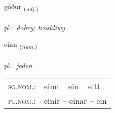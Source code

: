 \documentclass[frontgrid, backgrid]{flacards}\usepackage[]{graphicx}\usepackage[]{xcolor}
\begin{document}
\renewcommand{\flhead}{\vskip5pt \fboxsep=0pt {\small\bfseries\footnotesize Lýsingarorð | Adjective}}
\renewcommand{\fcfoot}{\vskip5pt \fboxsep=0pt \hspace{2pt}{\small\bfseries\footnotesize 1K}}

\renewcommand{\blhead}{\vskip5pt {\small\bfseries\footnotesize Lýsingarorð | Adjective }}
\renewcommand{\bcfoot}{\vskip5pt \hspace{2pt}{\small\bfseries\footnotesize 1K}}


{góður \small{\textsubscript{(\textit{adj.})}} \\[1ex] %
\textphonetic{[kouːðʏr]} \\
pl.: \emph{dobry; troskliwy} \\  [2ex]
\renewcommand*{\arraystretch}{0.8}
}

\renewcommand{\flhead}{\vskip5pt \fboxsep=0pt {\small\bfseries\footnotesize Töluorð | Numeral}}
\renewcommand{\fcfoot}{\vskip5pt \fboxsep=0pt \hspace{2pt}{\small\bfseries\footnotesize 1K}}

\renewcommand{\blhead}{\vskip5pt {\small\bfseries\footnotesize Töluorð | Numeral }}
\renewcommand{\bcfoot}{\vskip5pt \hspace{2pt}{\small\bfseries\footnotesize 1K}}


{einn \small{\textsubscript{(\textit{num.})}} \\[1ex] %
\textphonetic{[eitn̥]} \\
pl.: \emph{jeden} \\  [2ex]
\renewcommand*{\arraystretch}{0.8}
\begin{tabular}{ll}
\textsc{sg.nom.}: & einn  --  ein -- eitt \\ 
\textsc{pl.nom.}: & einir -- einar -- ein
\end{tabular}
}
\end{document}
